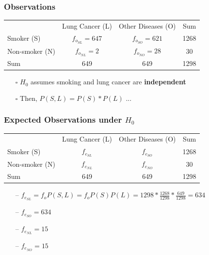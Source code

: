 \documentclass[handout]{beamer}
\begin{document}
\begin{frame}
    \frametitle{Observations}
    \begin{tabular}{l c c c}
    \toprule
         & Lung Cancer (L) & Other Diseases (O) & Sum \\
        Smoker (S) & \small{$f_{o_{SL}}=647$} & \small{$f_{o_{SO}}=621$} & \small{1268} \\
        Non-smoker (N) & \small{$f_{o_{NL}}=2$} & \small{$f_{o_{NO}}=28$} & \small{30} \\
        Sum & \small{649} & \small{649} & \small{1298} \\
    \bottomrule
    \end{tabular}
    \vspace{8pt}
    \begin{itemize}[wide = 0pt]
        \item[$\square$] $H_0$ assumes smoking and lung cancer are \textbf{independent}
        \item[$\square$] Then, $P(S, L)=P(S)*P(L)$ ...
    \end{itemize} 
    \vspace*{\fill}
\end{frame}

 \begin{frame}
    \frametitle{Expected Observations under $H_0$}
    \begin{tabular}{l c c c}
    \toprule
         & Lung Cancer (L) & Other Diseases (O) & Sum \\
        Smoker (S) & \small{$f_{e_{SL}}$} & \small{$f_{e_{SO}}$} & \small{1268} \\
        Non-smoker (N) & \small{$f_{e_{NL}}$} & \small{$f_{e_{NO}}$} & \small{30} \\
        Sum & \small{649} & \small{649} & \small{1298} \\
    \bottomrule
    \end{tabular}
    \vspace{8pt}
    \begin{itemize}[wide = 0pt]
        \item[--] $f_{e_{SL}}=f_oP(S,L)=f_oP(S)P(L)=1298*\frac{1268}{1298}*\frac{649}{1298}=634$
        \item[--] $f_{e_{SO}}=634$
        \item[--] $f_{e_{NL}}=15$
        \item[--] $f_{e_{NO}}=15$
    \end{itemize} 
    \vspace*{\fill}
\end{frame}
 
\end{document}
